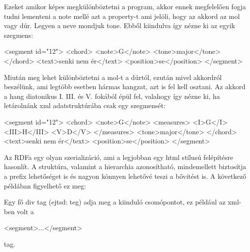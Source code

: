 Ezeket amikor képes megkülönböztetni a program, akkor ennek megfelelően fogja tudni lementeni a note mellé azt a property-t ami jelöli, hogy az akkord az mol vagy dúr. Legyen a neve mondjuk tone. Ebből kiindulva így nézne ki az egyik szegmens:
\begin{xml}
<segment id="12">
   <chord>
      <note>G</note>
      <tone>major</tone>
   </chord>
   <text>senki nem ér</text>
   <position>se</position>
</segment>
\end{xml}

Miután meg lehet különböztetni a mol-t a dúrtól, ezután mivel akkordról beszélünk, ami legtöbb esetben hármas hangzat, azt is fel kell osztani. Az akkord a hang diatonikus I. III. és V. fokából épül fel, valahogy így nézne ki, ha letárolnánk xml adatstruktúrába csak egy szegmensét:
\begin{xml}
<segment id="12">
   <chord>
      <note>G</note>
      <measures>
         <I>G</I>
         <III>H</III>
         <V>D</V>
      </measures>
      <tone>major</tone>
   </chord>
   <text>senki nem ér</text>
   <position>se</position>
</segment>
\end{xml}



\cite{rdfa_with_example}
Az RDFa egy olyan szerializáció, ami a legjobban egy html stílusú felépítésre hasonlít. A struktúra, valamint a hierarchia azonosítható, mindemellett biztosítja a prefix lehetőséget is és nagyon könnyen lehetővé teszi a bővítést is. A következő példában figyelhető ez meg:


Egy fő div tag (ejtsd: teg) adja meg a kiinduló csomópontot, ez például az xml-ben volt a 
\begin{xml}
<segment>...</segment>
\end{xml} tag. 

